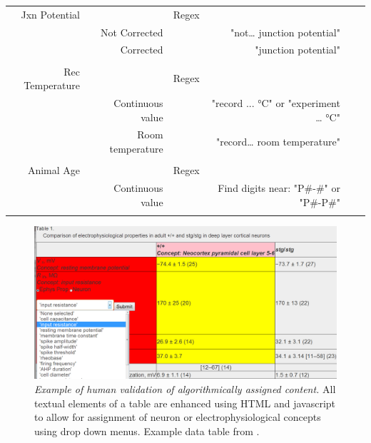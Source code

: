 \documentclass{template/frontiersSCNS} %
\begin{document}
\begin{table}[!t]
{\begin{tabular}{rrrrrr}
    Jxn Potential &        & Regex &       &       \\
          & Not Corrected &        &"not… junction potential"   &       \\
          & Corrected &        &"junction potential" &       \\
          &       &              &   &    \\
    Rec Temperature &        & Regex &       &       \\
          & Continuous value &        & "record ... °C" or "experiment … °C" &       \\
          & Room temperature &       & "record… room temperature"  &       \\
          &       &       &        &     \\
    Animal Age &        & Regex &       &       \\
          & Continuous value &        & Find digits near: "P\#-\#" or "P\#-P\#"&       \\
    \botrule
    \end{tabular}}
{}
\end{table}

\begin{figure}
\centering
\includegraphics[scale = 1]{figures/human_validation_example.jpg}
\caption{\textit{Example of human validation of algorithmically assigned content.}  
All textual elements of a table are enhanced using HTML and javascript to allow for assignment of neuron or electrophysiological concepts using drop down menus.  
Example data table from \citet{pasquale_increased_1997}.}
\label{human_validation}
\end{figure}
\end{document}
